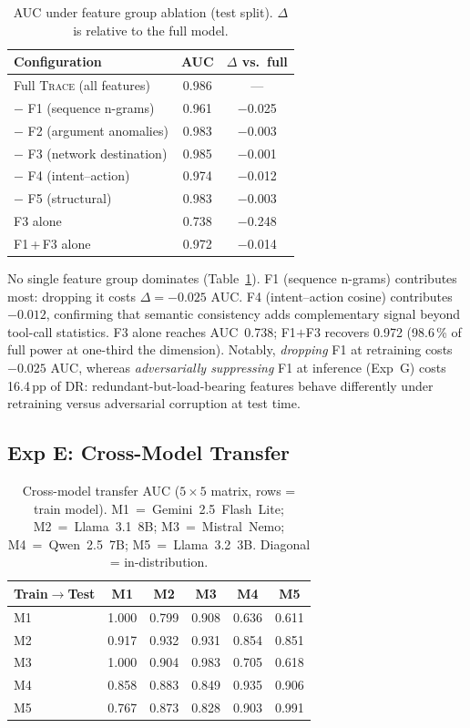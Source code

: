 \documentclass[conference]{IEEEtran}
\begin{document}
\begin{table}[t]
\centering
\caption{AUC under feature group ablation (test split).
  $\Delta$ is relative to the full model.}
\label{tab:ablation}
\begin{tabular}{lcc}
\toprule
Configuration & AUC & $\Delta$ vs.\ full \\
\midrule
Full \textsc{Trace} (all features)  & 0.986 & --- \\
\quad $-$ F1 (sequence n-grams)     & 0.961 & $-$0.025 \\
\quad $-$ F2 (argument anomalies)   & 0.983 & $-$0.003 \\
\quad $-$ F3 (network destination)  & 0.985 & $-$0.001 \\
\quad $-$ F4 (intent--action)       & 0.974 & $-$0.012 \\
\quad $-$ F5 (structural)           & 0.983 & $-$0.003 \\
\midrule
F3 alone                            & 0.738 & $-$0.248 \\
F1\,+\,F3 alone                     & 0.972 & $-$0.014 \\
\bottomrule
\end{tabular}
\end{table}

No single feature group dominates (Table~\ref{tab:ablation}).
F1 (sequence n-grams) contributes most: dropping it costs
$\Delta{=}{-}0.025$ AUC.  F4 (intent--action cosine) contributes
$-0.012$, confirming that semantic consistency adds complementary
signal beyond tool-call statistics.  F3 alone reaches AUC~0.738;
F1$+$F3 recovers 0.972 (98.6\,\% of full power at one-third the
dimension).  Notably, \emph{dropping} F1 at retraining costs
$-0.025$ AUC, whereas \emph{adversarially suppressing} F1 at
inference (Exp~G) costs 16.4\,pp of DR: redundant-but-load-bearing
features behave differently under retraining versus adversarial
corruption at test time.

\subsection{Exp E: Cross-Model Transfer}
\label{sec:exp_e}

\begin{table}[t]
\centering
\caption{Cross-model transfer AUC ($5{\times}5$ matrix, rows = train model).
  M1~=~Gemini~2.5~Flash~Lite; M2~=~Llama~3.1~8B; M3~=~Mistral~Nemo;
  M4~=~Qwen~2.5~7B; M5~=~Llama~3.2~3B.  Diagonal = in-distribution.}
\label{tab:transfer}
\begin{tabular}{lccccc}
\toprule
Train$\!\to$Test & M1 & M2 & M3 & M4 & M5 \\
\midrule
M1 & 1.000 & 0.799 & 0.908 & 0.636 & 0.611 \\
M2 & 0.917 & 0.932 & 0.931 & 0.854 & 0.851 \\
M3 & 1.000 & 0.904 & 0.983 & 0.705 & 0.618 \\
M4 & 0.858 & 0.883 & 0.849 & 0.935 & 0.906 \\
M5 & 0.767 & 0.873 & 0.828 & 0.903 & 0.991 \\
\bottomrule
\end{tabular}
\end{table}
\end{document}
